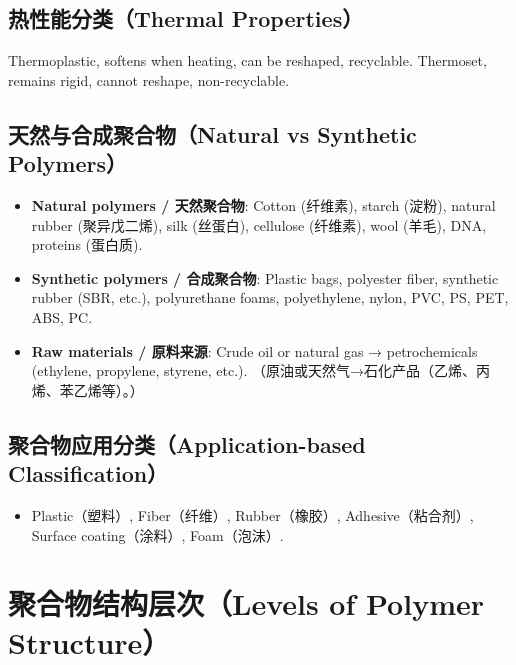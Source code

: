 \documentclass[12pt,a4paper]{ctexart}
\begin{document}
\subsection{热性能分类（Thermal Properties）}

Thermoplastic, softens when heating, can be reshaped, recyclable. Thermoset, remains rigid, cannot reshape, non-recyclable.



\subsection{天然与合成聚合物（Natural vs Synthetic Polymers）}
\begin{itemize}[leftmargin=*]
    \item \textbf{Natural polymers / 天然聚合物}: Cotton (纤维素), starch (淀粉), natural rubber (聚异戊二烯), silk (丝蛋白), cellulose (纤维素), wool (羊毛), DNA, proteins (蛋白质).
    \item \textbf{Synthetic polymers / 合成聚合物}: Plastic bags, polyester fiber, synthetic rubber (SBR, etc.), polyurethane foams, polyethylene, nylon, PVC, PS, PET, ABS, PC.
    \item \textbf{Raw materials / 原料来源}: Crude oil or natural gas → petrochemicals (ethylene, propylene, styrene, etc.). （原油或天然气→石化产品（乙烯、丙烯、苯乙烯等）。）
\end{itemize}

\subsection{聚合物应用分类（Application-based Classification）}
\begin{itemize}[leftmargin=*]
    \item Plastic（塑料）, Fiber（纤维）, Rubber（橡胶）, Adhesive（粘合剂）, Surface coating（涂料）, Foam（泡沫）.
\end{itemize}

\section{聚合物结构层次（Levels of Polymer Structure）}
\end{document}
